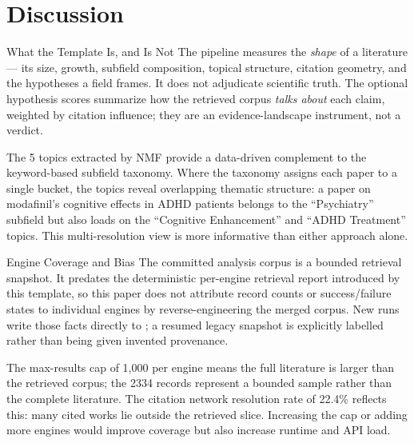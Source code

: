 \documentclass[
  ignorenonframetext,
]{beamer}
\author{\texorpdfstring{}{}}
\date{}
\begin{document}
\section{Discussion}\label{discussion}

\begin{frame}[allowframebreaks]{What the Template Is, and Is Not}
\protect{}\label{what-the-template-is-and-is-not}
The pipeline measures the \emph{shape} of a literature --- its size,
growth, subfield composition, topical structure, citation geometry, and
the hypotheses a field frames. It does not adjudicate scientific truth.
The optional hypothesis scores summarize how the retrieved corpus
\emph{talks about} each claim, weighted by citation influence; they are
an evidence-landscape instrument, not a verdict.

The 5 topics extracted by NMF provide a data-driven complement to the
keyword-based subfield taxonomy. Where the taxonomy assigns each paper
to a single bucket, the topics reveal overlapping thematic structure: a
paper on modafinil's cognitive effects in ADHD patients belongs to the
``Psychiatry'' subfield but also loads on the ``Cognitive Enhancement''
and ``ADHD Treatment'' topics. This multi-resolution view is more
informative than either approach alone.
\end{frame}

\begin{frame}{Engine Coverage and Bias}
\protect{}\label{engine-coverage-and-bias}
The committed analysis corpus is a bounded retrieval snapshot. It
predates the deterministic per-engine retrieval report introduced by
this template, so this paper does not attribute record counts or
success/failure states to individual engines by reverse-engineering the
merged corpus. New runs write those facts directly to
; a resumed legacy snapshot
is explicitly labelled
 rather than being
given invented provenance.

The max-results cap of 1,000 per engine means the full literature is
larger than the retrieved corpus; the 2334 records represent a bounded
sample rather than the complete literature. The citation network
resolution rate of 22.4\% reflects this: many cited works lie outside
the retrieved slice. Increasing the cap or adding more engines would
improve coverage but also increase runtime and API load.
\end{frame}
\end{document}
